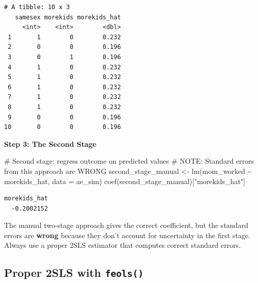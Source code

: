 \documentclass[
  letterpaper,
  DIV=11,
  numbers=noendperiod]{scrreprt}
\newenvironment{Shaded}{\begin{snugshade}}{\end{snugshade}}
\newcommand{\AlertTok}[1]{\textcolor[rgb]{0.68,0.00,0.00}{#1}}
\newcommand{\AttributeTok}[1]{\textcolor[rgb]{0.40,0.45,0.13}{#1}}
\newcommand{\CommentTok}[1]{\textcolor[rgb]{0.37,0.37,0.37}{#1}}
\newcommand{\FunctionTok}[1]{\textcolor[rgb]{0.28,0.35,0.67}{#1}}
\newcommand{\NormalTok}[1]{\textcolor[rgb]{0.00,0.23,0.31}{#1}}
\newcommand{\OtherTok}[1]{\textcolor[rgb]{0.00,0.23,0.31}{#1}}
\newcommand{\SpecialCharTok}[1]{\textcolor[rgb]{0.37,0.37,0.37}{#1}}
\newcommand{\StringTok}[1]{\textcolor[rgb]{0.13,0.47,0.30}{#1}}
\begin{document}
\begin{verbatim}
# A tibble: 10 x 3
   samesex morekids morekids_hat
     <int>    <int>        <dbl>
 1       1        0        0.232
 2       0        0        0.196
 3       0        1        0.196
 4       1        0        0.232
 5       1        0        0.232
 6       1        0        0.232
 7       1        0        0.232
 8       1        0        0.232
 9       0        0        0.196
10       0        0        0.196
\end{verbatim}

\textbf{Step 3: The Second Stage}

\begin{Shaded}
\begin{Highlighting}[]
\CommentTok{\# Second stage: regress outcome on predicted values}
\CommentTok{\# }\AlertTok{NOTE}\CommentTok{: Standard errors from this approach are WRONG}
\NormalTok{second\_stage\_manual }\OtherTok{\textless{}{-}} \FunctionTok{lm}\NormalTok{(mom\_worked }\SpecialCharTok{\textasciitilde{}}\NormalTok{ morekids\_hat, }\AttributeTok{data =}\NormalTok{ ae\_sim)}
\FunctionTok{coef}\NormalTok{(second\_stage\_manual)[}\StringTok{"morekids\_hat"}\NormalTok{]}
\end{Highlighting}
\end{Shaded}

\begin{verbatim}
morekids_hat 
  -0.2002152 
\end{verbatim}

\begin{tcolorbox}[enhanced jigsaw, arc=.35mm, bottomrule=.15mm, bottomtitle=1mm, breakable, colback=white, colbacktitle=quarto-callout-warning-color!10!white, colframe=quarto-callout-warning-color-frame, coltitle=black, left=2mm, leftrule=.75mm, opacityback=0, opacitybacktitle=0.6, rightrule=.15mm, title=\textcolor{quarto-callout-warning-color}{\faExclamationTriangle}\hspace{0.5em}{Standard Error Warning}, titlerule=0mm, toprule=.15mm, toptitle=1mm]

The manual two-stage approach gives the correct coefficient, but the
standard errors are \textbf{wrong} because they don't account for
uncertainty in the first stage. Always use a proper 2SLS estimator that
computes correct standard errors.

\end{tcolorbox}

\subsection{\texorpdfstring{Proper 2SLS with
\texttt{feols()}}{Proper 2SLS with feols()}}\label{proper-2sls-with-feols}
\end{document}
